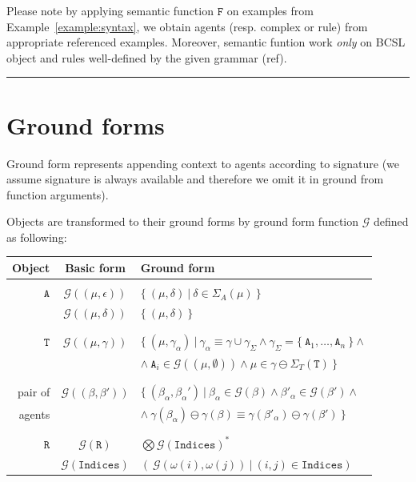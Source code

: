 \documentclass[12pt]{fithesis2}
\begin{document}
Please note by applying semantic function $\mathtt{F}$ on examples from Example~\ref{example:syntax}, we obtain agents (resp. complex or rule) from appropriate referenced examples. Moreover, semantic funtion work \emph{only} on BCSL object and rules well-defined by the given grammar (ref).


\noindent\rule{\textwidth}{2pt}

\section{Ground forms}

Ground form represents appending context to agents according to signature (we assume signature is always available and therefore we omit it in ground from function arguments).

Objects are transformed to their ground forms by ground form function $\mathcal{G}$ defined as following:

\begin{center}
\begin{tabular}{ r c l }
Object & Basic form & Ground form \\
\hline
 & & \\
$\mathtt{A}$ & $\mathcal{G}((\mu, \epsilon))$ & $\{~ (\mu, \delta) ~|~ \delta \in \Sigma_A(\mu) ~\}$\\
 & $\mathcal{G}((\mu, \delta))$ & $\{~(\mu, \delta) ~\}$\\
 & & \\
 \hline
 & & \\
$\mathtt{T}$ & $\mathcal{G}((\mu, \gamma))$ & $\{~ (\mu, \gamma_\alpha) ~|~ \gamma_\alpha \equiv \gamma \cup \gamma_\Sigma \wedge \gamma_\Sigma = \{~ \mathtt{A}_1, \ldots, \mathtt{A}_n ~\} \wedge$\\
 & & $\wedge~ \mathtt{A}_i \in \mathcal{G}((\mu, \emptyset)) \wedge \mu \in \gamma \ominus \Sigma_T(\mathtt{T}) ~\}$ \\
 & & \\
 \hline
 & & \\
pair of & $\mathcal{G}((\beta, \beta'))$ & $\{~ (\beta_\alpha, \beta_\alpha') ~|~ \beta_\alpha \in \mathcal{G}(\beta) \wedge \beta'_\alpha \in \mathcal{G}(\beta') \wedge$\\
agents & & $\wedge~ \gamma(\beta_\alpha) \ominus \gamma(\beta) \equiv \gamma(\beta'_\alpha) \ominus \gamma(\beta') ~\} $ \\
 & & \\
 \hline
 & & \\
$\mathtt{R}$ & $\mathcal{G}(\mathtt{R})$ & $ \bigotimes \mathcal{G}(\mathtt{Indices})^* $ \\
 & $\mathcal{G}(\mathtt{Indices})$ & $(~\mathcal{G}(\omega(i), \omega(j)) ~|~ (i,j) \in \mathtt{Indices})$\\
 
\end{tabular}
\end{center}
\end{document}
